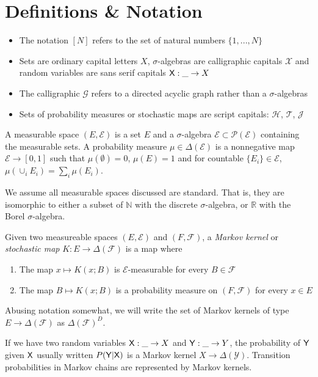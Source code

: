\section{Definitions \& Notation}


\begin{itemize}
    \item The notation $[N]$ refers to the set of natural numbers $\{1,...,N\}$
    \item Sets are ordinary capital letters $X$, $\sigma$-algebras are calligraphic capitals $\mathcal{X}$ and random variables are sans serif capitals $\mathsf{X}:\_\to X$
    \item The calligraphic $\mathcal{G}$ refers to a directed acyclic graph rather than a $\sigma$-algebras
    \item Sets of probability measures or stochastic maps are script capitals: $\mathscr{H}$, $\mathscr{T}$, $\mathscr{J}$
\end{itemize}

A measurable space $(E,\mathcal{E})$ is a set $E$ and a $\sigma$-algebra $\mathcal{E}\subset\mathcal{P}(\mathcal{E})$ containing the measurable sets. A probability measure $\mu\in \Delta(\mathcal{E})$ is a nonnegative map $\mathcal{E}\to[0,1]$ such that $\mu(\emptyset)=0$, $\mu(E)=1$ and for countable $\{E_i\}\in \mathcal{E}$, $\mu(\cup_i E_i) = \sum_i \mu(E_i)$.

We assume all measurable spaces discussed are standard. That is, they are isomorphic to either a subset of $\mathbb{N}$ with the discrete $\sigma$-algebra, or $\mathbb{R}$ with the Borel $\sigma$-algebra.

Given two measureable spaces $(E,\mathcal{E})$ and $(F,\mathcal{F})$, a \emph{Markov kernel} or \emph{stochastic map} $K:E\to \Delta(\mathcal{F})$ is a map where
\begin{enumerate}
    \item The map $x\mapsto K(x;B)$ is $\mathcal{E}$-measurable for every $B\in\mathcal{F}$
    \item The map $B\mapsto K(x;B)$ is a probability measure on $(F,\mathcal{F})$ for every $x\in E$
\end{enumerate}

Abusing notation somewhat, we will write the set of Markov kernels of type $E\to \Delta(\mathcal{F})$ as $\Delta(\mathcal{F})^D$. 

If we have two random variables $\mathsf{X}:\_\to X$ and $\mathsf{Y}:\_\to Y$, the probability of $\mathsf{Y}$ given $\mathsf{X}$ usually written $P(\mathsf{Y}|\mathsf{X})$ is a Markov kernel $X\to \Delta(\mathcal{Y})$. Transition probabilities in Markov chains are represented by Markov kernels. 

